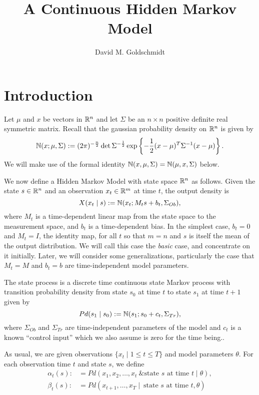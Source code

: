 \documentclass[12pt,leqno]{article}
\title{A Continuous Hidden Markov Model}
\author{David M. Goldschmidt}
\begin{document}
\newcommand{\p}{\ensuremath{u}}
\newcommand{\VV}{V}
\maketitle


\section{Introduction}
Let $\mu$ and $x$ be vectors in ${\mathbb R}^n$ and let $\Sigma$ be an $n\times{n}$ positive
definite real symmetric matrix.  Recall that the gaussian probability density
on ${\mathbb R}^n$ is given by 
$$
{\mathbb N}(x;\mu,\Sigma) := (2\pi)^{-\frac{n}{2}}\det{\Sigma}^{-\frac{1}{2}}\exp\left\{-\frac{1}{2}
(x - \mu)^T\Sigma^{-1}(x-\mu)\right\}.
$$
We will make use of the formal identity ${\mathbb N}(x,\mu,\Sigma) = {\mathbb N}(\mu,x,\Sigma)$ below.

We now define a Hidden Markov Model with state space ${\mathbb R}^n$ as follows.  Given the state $s\in{\mathbb R}^n$ and an observation $x_t\in{\mathbb R}^m$ at time $t$, the output density is
$$
X(x_t\mid s) := {\mathbb N}(x_t;M_ts + b_t,\Sigma_{Ob}),
$$
where $M_t$ is a time-dependent linear map from the state space to the
measurement space, and $b_t$ is a time-dependent bias.
In the simplest case, $b_t = 0$  and $M_t = I$, the identity map, for all $t$ so that $m = n$ and $s$ is itself the mean of the output distribution.  We will call this case the {\em basic} case, and concentrate on it initially. Later, we will consider some generalizations, particularly the case that $M_t = M$ and $b_t = b$ are time-independent model parameters.

The state process is a discrete time continuous state Markov process with transition probability density
from state $s_0$ at time $t$ to state $s_1$ at time $t+1$ given by
$$
Pd(s_1\mid s_0) :=  {\mathbb N}(s_1;s_0+c_t,\Sigma_{Tr}),
$$
where $\Sigma_{Ob}$ and $\Sigma_{Tr}$ are time-independent parameters of the model
and $c_t$ is a known ``control input'' which we also assume is zero for the time being..

As usual, we are given observations $\{x_t\mid 1\le t\le T\}$ and model parameters $\theta$.  For each observation time $t$ and state $s$, we define
\begin{align*}
  \alpha_t(s) :&= Pd(x_1,x_2,\dots,x_t~ \& \text{state $s$ at time $t$}\mid \theta ),\\
  \beta_t(s) :&= Pd(x_{t+1},\dots,x_T \mid ~\text{state $s$ at time $t$},\theta)\\
\end{align*}
\end{document}

